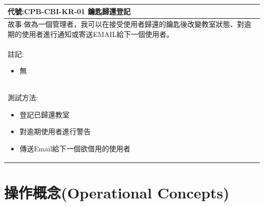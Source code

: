 \documentclass{article}
\begin{document}
\begin{table}[H]
	\begin{tabular}{| m{13cm} |}
		\hline
		代號:CPB-CBI-KR-01	鑰匙歸還登記                                      \\ \hline
		故事:做為一個管理者，我可以在接受使用者歸還的鑰匙後改變教室狀態、對逾期的使用者進行通知或寄送EMAIL給下一個使用者。 \\	\hline
		註記:
		\begin{itemize}
			\item 無
		\end{itemize}                                               \\ \hline
		測試方法:
		\begin{itemize}
			\item 登記已歸還教室
			\item 對逾期使用者進行警告
			\item 傳送Email給下一個欲借用的使用者
		\end{itemize}
		\\	\hline
	\end{tabular}
\end{table}

\newpage

\section[操作概念(OPERATIONAL CONCEPTS)]{操作概念(Operational Concepts)}

\newpage
\end{document}
